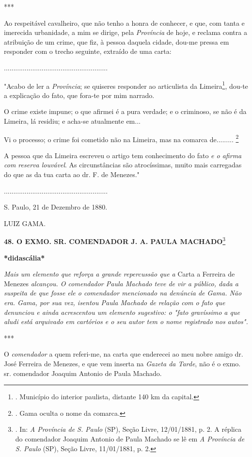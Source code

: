 ***

Ao respeitável cavalheiro, que não tenho a honra de conhecer, e que, com
tanta e imerecida urbanidade, a mim se dirige, pela \emph{Província} de
hoje, e reclama contra a atribuição de um crime, que fiz, à pessoa
daquela cidade, dou-me pressa em responder com o trecho seguinte,
extraído de uma carta:

.......................................................

"Acabo de ler a \emph{Província}; se quiseres responder ao articulista
da Limeira\footnote{. Município do interior paulista, distante 140 km da
  capital.}, dou-te a explicação do fato, que fora-te por mim narrado.

O crime existe impune; o que afirmei é a pura verdade; e o criminoso, se
não é da Limeira, lá residiu; e acha-se atualmente em...

Vi o processo; o crime foi cometido não na Limeira, mas na comarca
de......... \footnote{. Gama oculta o nome da comarca.}

A pessoa que da Limeira
escreveu o artigo tem conhecimento do fato \emph{e o afirma com reserva
louvável}. As circunstâncias são atrocíssimas, muito mais carregadas do
que as da tua carta ao dr. F. de Menezes."

.......................................................

S. Paulo, 21 de Dezembro de 1880.

LUIZ GAMA.

\textbf{48. O EXMO. SR. COMENDADOR J. A. PAULA MACHADO}\footnote{. In:
  \emph{A Província de S. Paulo} (SP), Seção Livre, 12/01/1881, p. 2. A
  réplica do comendador Joaquim Antonio de Paula Machado se lê em
  \emph{A Província de S. Paulo} (SP), Seção Livre, 11/01/1881, p. 2.}

\textbf{*}\textbf{didascália*}

\emph{Mais um elemento que reforça a grande repercussão que a} Carta a
Ferreira de Menezes \emph{alcançou. O comendador Paula Machado teve de
vir a público, dada a suspeita de que fosse ele o comendador mencionado
na denúncia de Gama. Não era. Gama, por sua vez, isentou Paula Machado
de relação com o fato que denunciou e ainda acrescentou um elemento
sugestivo: o "fato gravíssimo a que aludi está arquivado em cartórios e
o seu autor tem o nome registrado nos autos". }

***

O \emph{comendador} a quem referi-me, na carta que enderecei ao meu
nobre amigo dr. José Ferreira de Menezes, e que vem inserta na
\emph{Gazeta da Tarde}, não é o exmo. sr. comendador Joaquim Antonio de
Paula Machado.

